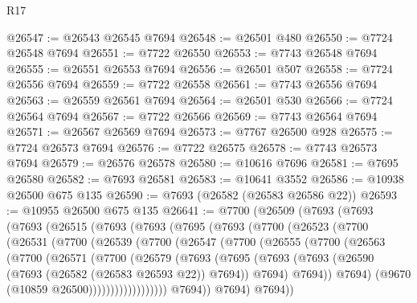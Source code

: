 \begin{lexlean}{R17}
\begin{coremodule}
@26547 := @26543 @26545 @7694
@26548 := @26501 @480
@26550 := @7724 @26548 @7694
@26551 := @7722 @26550
@26553 := @7743 @26548 @7694
@26555 := @26551 @26553 @7694
@26556 := @26501 @507
@26558 := @7724 @26556 @7694
@26559 := @7722 @26558
@26561 := @7743 @26556 @7694
@26563 := @26559 @26561 @7694
@26564 := @26501 @530
@26566 := @7724 @26564 @7694
@26567 := @7722 @26566
@26569 := @7743 @26564 @7694
@26571 := @26567 @26569 @7694
@26573 := @7767 @26500 @928
@26575 := @7724 @26573 @7694
@26576 := @7722 @26575
@26578 := @7743 @26573 @7694
@26579 := @26576 @26578
@26580 := @10616 @7696
@26581 := @7695 @26580
@26582 := @7693 @26581
@26583 := @10641 @3552
@26586 := @10938 @26500 @675 @135
@26590 := @7693 (@26582 (@26583 @26586 @22))
@26593 := @10955 @26500 @675 @135
@26641 := @7700
    (@26509
      (@7693
        (@7693
          (@7693
            (@26515
              (@7693
                (@7693
                  (@7695
                    (@7693
                      (@7700
                        (@26523
                          (@7700
                            (@26531
                              (@7700
                                (@26539
                                  (@7700
                                    (@26547
                                      (@7700
                                        (@26555
                                          (@7700
                                            (@26563
                                              (@7700
                                                (@26571
                                                  (@7700
                                                    (@26579
                                                      (@7693
                                                        (@7695
                                                          (@7693
                                                            (@7693
                                                              (@26590
                                                                (@7693
                                                                  (@26582 (@26583 @26593 @22))
                                                                  @7694))
                                                              @7694)
                                                            @7694))
                                                        @7694)
                                                      (@9670 (@10859 @26500))))))))))))))))))
                      @7694))
                  @7694)
                @7694))

\end{coremodule}
\end{lexlean}
